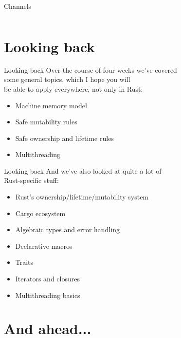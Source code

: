 \documentclass[usenames,dvipsnames,10pt,aspectratio=169]{beamer}
\begin{document}
\begin{frame}{Channels}
	\normalsize
	\inputminted[fontsize=\normalsize]{rust}{code/mpsc2.rs}
	\vspace{0.4cm}
\end{frame}


\section{Looking back}

\begin{frame}{Looking back}
	\large
	Over the course of four weeks we've covered\\
	some general topics, which I hope you will\\
	be able to apply everywhere, not only in Rust:\\
	\vspace{0.1cm}
\begin{itemize}[label=$\bullet$]
	\item Machine memory model
	\item Safe mutability rules
	\item Safe ownership and lifetime rules
	\item Multithreading
\end{itemize}
	
\end{frame}

\begin{frame}{Looking back}
	\large
	And we've also looked at quite a lot of\\
	Rust-specific stuff:
	\vspace{0.1cm}
\begin{itemize}[label=$\bullet$]
	\item Rust's ownership/lifetime/mutability system
	\item Cargo ecosystem
	\item Algebraic types and error handling
	\item Declarative macros
	\item Traits
	\item Iterators and closures
	\item Multithreading basics
\end{itemize}
\end{frame}

\section{And ahead...}
\end{document}
